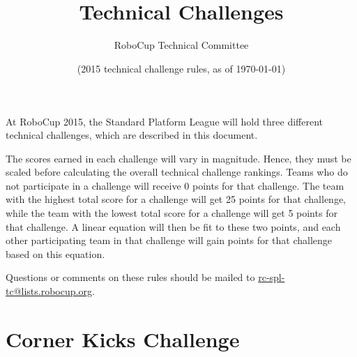 \documentclass[12pt]{article}
\title{\leaguename \\ Technical Challenges}
\author{RoboCup Technical Committee}
\date{(2015 technical challenge rules, as of \today)}
\begin{document}
\maketitle

At RoboCup 2015, the Standard Platform League will hold three different technical challenges, which are described in this document.

The scores earned in each challenge will vary in magnitude.  Hence, they must be scaled before calculating the overall technical challenge rankings.  Teams who do not participate in a challenge will receive 0 points for that challenge.  The team with the highest total score for a challenge will get 25 points for that challenge, while the team with the lowest total score for a challenge will get 5 points for that challenge.  A linear equation will then be fit to these two points, and each other participating team in that challenge will gain points for that challenge based on this equation.

Questions or comments on these rules should be mailed to {\small \url{rc-spl-tc@lists.robocup.org}}.

\vfill

\renewcommand\contentsname{Challenges}
\tableofcontents
\setcounter{tocdepth}{1}

\thispagestyle{fancy}

\clearpage

\cfoot{\thepage}
\setcounter{page}{1}

\newcommand{\openMinNum}{three}




\section{Corner Kicks Challenge}
\end{document}
